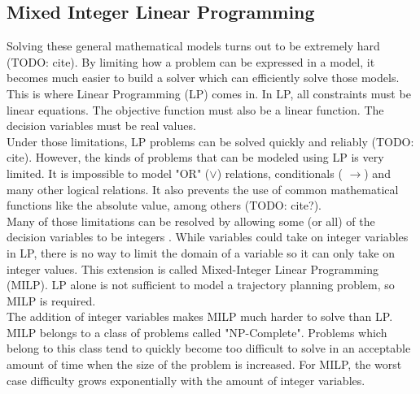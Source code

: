 \subsection{Mixed Integer Linear Programming}
Solving these general mathematical models turns out to be extremely hard (TODO: cite). By limiting how a problem can be expressed in a model, it becomes much easier to build a solver which can efficiently solve those models. This is where Linear Programming (LP) comes in. In LP, all constraints must be linear equations. The objective function must also be a linear function. The decision variables must be real values. \\
Under those limitations, LP problems can be solved quickly and reliably (TODO: cite). However, the kinds of problems that can be modeled using LP is very limited. It is impossible to model "OR" ($\vee$) relations, conditionals ( $\rightarrow$) and many other logical relations. It also prevents the use of common mathematical functions like the absolute value, among others (TODO: cite?). \\
Many of those limitations can be resolved by allowing some (or all) of the decision variables to be integers \cite{Mitra1994}. While variables could take on integer variables in LP, there is no way to limit the domain of a variable so it can only take on integer values. This extension is called Mixed-Integer Linear Programming (MILP). LP alone is not sufficient to model a trajectory planning problem, so MILP is required.\\
The addition of integer variables makes MILP much harder to solve than LP. MILP belongs to a class of problems called "NP-Complete". Problems which belong to this class tend to quickly become too difficult to solve in an acceptable amount of time when the size of the problem is increased. For MILP, the worst case difficulty grows exponentially with the amount of integer variables.
